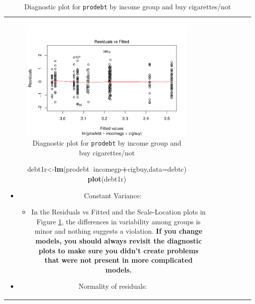 \documentclass[]{book}
\newenvironment{Shaded}{\begin{snugshade}}{\end{snugshade}}
\newcommand{\KeywordTok}[1]{\textcolor[rgb]{0.13,0.29,0.53}{\textbf{#1}}}
\newcommand{\DataTypeTok}[1]{\textcolor[rgb]{0.13,0.29,0.53}{#1}}
\newcommand{\OperatorTok}[1]{\textcolor[rgb]{0.81,0.36,0.00}{\textbf{#1}}}
\newcommand{\NormalTok}[1]{#1}
\providecommand{\tightlist}{%
  \setlength{\itemsep}{0pt}\setlength{\parskip}{0pt}}
\theoremstyle{definition}
\theoremstyle{definition}
\theoremstyle{remark}
\begin{document}
\begin{longtable}[]{@{}ccccccc@{}}
\begin{minipage}[b]{0.10\columnwidth}
\begin{Shaded}
\begin{Highlighting}[]
\begin{Shaded}
\begin{Highlighting}[]
\begin{Shaded}
\begin{Highlighting}[]
\begin{Shaded}
\begin{Highlighting}[]
\begin{Shaded}
\begin{Highlighting}[]
\begin{enumerate}
  \begin{figure}
  \centering
  \includegraphics{04-twoWayAnova_files/figure-latex/Figure4-14-1.pdf}
  \caption{\label{fig:Figure4-14}Diagnostic plot for \texttt{prodebt} by
  income group and buy cigarettes/not}
  \end{figure}

\begin{Shaded}
\begin{Highlighting}[]
\NormalTok{debt1r<-}\KeywordTok{lm}\NormalTok{(prodebt}\OperatorTok{~}\NormalTok{incomegp}\OperatorTok{+}\NormalTok{cigbuy,}\DataTypeTok{data=}\NormalTok{debtc)}
\KeywordTok{plot}\NormalTok{(debt1r)}
\end{Highlighting}
\end{Shaded}

  \begin{itemize}
  \item
    Constant Variance:

    \begin{itemize}
    \tightlist
    \item
      In the Residuals vs Fitted and the Scale-Location plots in Figure
      \ref{fig:Figure4-14}, the differences in variability among groups
      is minor and nothing suggests a violation. \textbf{If you change
      models, you should always revisit the diagnostic plots to make
      sure you didn't create problems that were not present in more
      complicated models.}
    \end{itemize}
  \item
    Normality of residuals:


\end{itemize}
\end{enumerate}
\end{Highlighting}
\end{Shaded}
\end{Highlighting}
\end{Shaded}
\end{Highlighting}
\end{Shaded}
\end{Highlighting}
\end{Shaded}
\end{Highlighting}
\end{Shaded}
\end{minipage}
\end{longtable}
\end{document}
